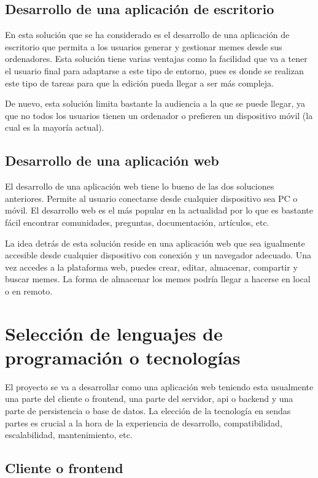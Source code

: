 \subsection{Desarrollo de una aplicación de escritorio}

En esta solución que se ha considerado es el desarrollo de una aplicación de escritorio que permita a los usuarios generar y gestionar memes desde sus ordenadores. Esta solución tiene varias ventajas como la facilidad que va a tener el usuario final para adaptarse a este tipo de entorno, pues es donde se realizan este tipo de tareas para que la edición pueda llegar a ser más compleja.

De nuevo, esta solución limita bastante la audiencia a la que se puede llegar, ya que no todos los usuarios tienen un ordenador o prefieren un dispositivo móvil (la cual es la mayoría actual).

\subsection{Desarrollo de una aplicación web}

El desarrollo de una aplicación web tiene lo bueno de las dos soluciones anteriores. Permite al usuario conectarse desde cualquier dispositivo sea PC o móvil. El desarrollo web es el más popular en la actualidad por lo que es bastante fácil encontrar comunidades, preguntas, documentación, artículos, etc.

La idea detrás de esta solución reside en una aplicación web que sea igualmente accesible desde cualquier dispositivo con conexión y un navegador adecuado. Una vez accedes a la plataforma web, puedes crear, editar, almacenar, compartir y buscar memes. La forma de almacenar los memes podría llegar a hacerse en local o en remoto.

\section{Selección de lenguajes de programación o tecnologías}

El proyecto se va a desarrollar como una aplicación web teniendo esta usualmente una parte del cliente o frontend, una parte del servidor, api o backend y una parte de persistencia o base de datos. La elección de la tecnología en sendas partes es crucial a la hora de la experiencia de desarrollo, compatibilidad, escalabilidad, mantenimiento, etc.

\subsection{Cliente o frontend}

